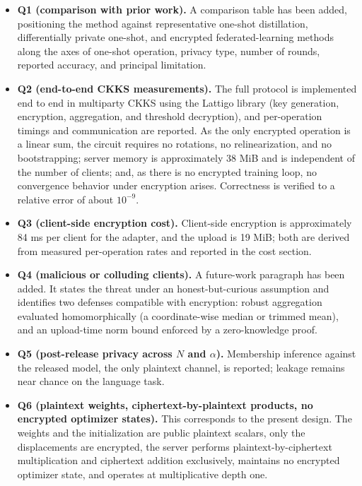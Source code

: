 \documentclass[11pt]{article}
\begin{document}
\begin{itemize}
\item \textbf{Q1 (comparison with prior work).} A comparison table has been added, positioning the method
against representative one-shot distillation, differentially private one-shot, and encrypted
federated-learning methods along the axes of one-shot operation, privacy type, number of rounds, reported
accuracy, and principal limitation.

\item \textbf{Q2 (end-to-end CKKS measurements).} The full protocol is implemented end to end in multiparty
CKKS using the Lattigo library (key generation, encryption, aggregation, and threshold decryption), and
per-operation timings and communication are reported. As the only encrypted operation is a linear sum, the
circuit requires no rotations, no relinearization, and no bootstrapping; server memory is approximately
38 MiB and is independent of the number of clients; and, as there is no encrypted training loop, no
convergence behavior under encryption arises. Correctness is verified to a relative error of about $10^{-9}$.

\item \textbf{Q3 (client-side encryption cost).} Client-side encryption is approximately 84 ms per client for
the adapter, and the upload is 19 MiB; both are derived from measured per-operation rates and reported in the
cost section.

\item \textbf{Q4 (malicious or colluding clients).} A future-work paragraph has been added. It states the
threat under an honest-but-curious assumption and identifies two defenses compatible with encryption: robust
aggregation evaluated homomorphically (a coordinate-wise median or trimmed mean), and an upload-time norm
bound enforced by a zero-knowledge proof.

\item \textbf{Q5 (post-release privacy across $N$ and $\alpha$).} Membership inference against the released
model, the only plaintext channel, is reported; leakage remains near chance on the language task.

\item \textbf{Q6 (plaintext weights, ciphertext-by-plaintext products, no encrypted optimizer states).} This
corresponds to the present design. The weights and the initialization are public plaintext scalars, only the
displacements are encrypted, the server performs plaintext-by-ciphertext multiplication and ciphertext
addition exclusively, maintains no encrypted optimizer state, and operates at multiplicative depth one.
\end{itemize}
\end{document}

